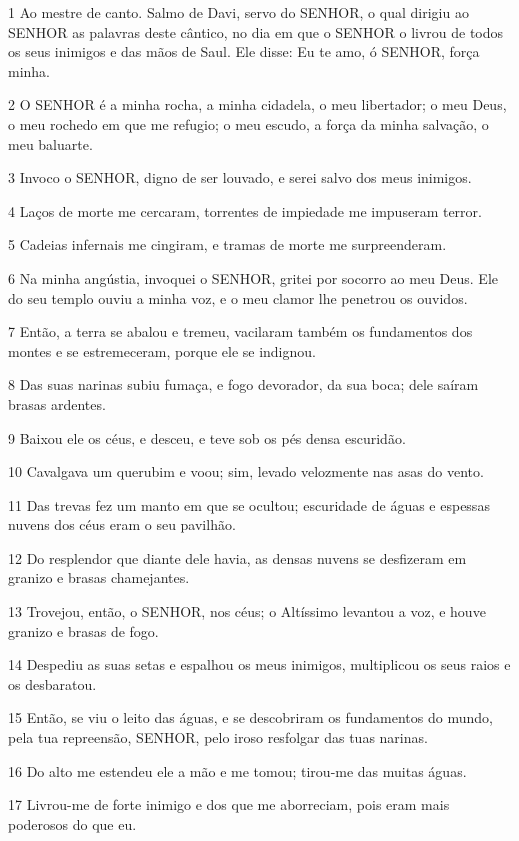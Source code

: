 \par 1 Ao mestre de canto. Salmo de Davi, servo do SENHOR, o qual dirigiu ao SENHOR as palavras deste cântico, no dia em que o SENHOR o livrou de todos os seus inimigos e das mãos de Saul. Ele disse: Eu te amo, ó SENHOR, força minha.
\par 2 O SENHOR é a minha rocha, a minha cidadela, o meu libertador; o meu Deus, o meu rochedo em que me refugio; o meu escudo, a força da minha salvação, o meu baluarte.
\par 3 Invoco o SENHOR, digno de ser louvado, e serei salvo dos meus inimigos.
\par 4 Laços de morte me cercaram, torrentes de impiedade me impuseram terror.
\par 5 Cadeias infernais me cingiram, e tramas de morte me surpreenderam.
\par 6 Na minha angústia, invoquei o SENHOR, gritei por socorro ao meu Deus. Ele do seu templo ouviu a minha voz, e o meu clamor lhe penetrou os ouvidos.
\par 7 Então, a terra se abalou e tremeu, vacilaram também os fundamentos dos montes e se estremeceram, porque ele se indignou.
\par 8 Das suas narinas subiu fumaça, e fogo devorador, da sua boca; dele saíram brasas ardentes.
\par 9 Baixou ele os céus, e desceu, e teve sob os pés densa escuridão.
\par 10 Cavalgava um querubim e voou; sim, levado velozmente nas asas do vento.
\par 11 Das trevas fez um manto em que se ocultou; escuridade de águas e espessas nuvens dos céus eram o seu pavilhão.
\par 12 Do resplendor que diante dele havia, as densas nuvens se desfizeram em granizo e brasas chamejantes.
\par 13 Trovejou, então, o SENHOR, nos céus; o Altíssimo levantou a voz, e houve granizo e brasas de fogo.
\par 14 Despediu as suas setas e espalhou os meus inimigos, multiplicou os seus raios e os desbaratou.
\par 15 Então, se viu o leito das águas, e se descobriram os fundamentos do mundo, pela tua repreensão, SENHOR, pelo iroso resfolgar das tuas narinas.
\par 16 Do alto me estendeu ele a mão e me tomou; tirou-me das muitas águas.
\par 17 Livrou-me de forte inimigo e dos que me aborreciam, pois eram mais poderosos do que eu.
